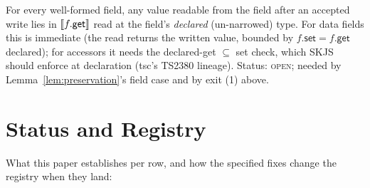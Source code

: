 \documentclass[11pt]{article}
\begin{document}
\begin{obligation}
\label{obl:getset}
For every well-formed field, any value readable from the field after an
accepted write lies in $\llbracket f.\mathsf{get} \rrbracket$ read at the field's
\emph{declared} (un-narrowed) type. For data fields this is immediate
(the read returns the written value, bounded by
$f.\mathsf{set} = f.\mathsf{get}$ declared); for accessors it needs the
declared-get $\subseteq$ set check, which SKJS should enforce at
declaration (tsc's TS2380 lineage). Status: \textsc{open}; needed by
Lemma~\ref{lem:preservation}'s field case and by exit (1) above.
\end{obligation}

\section{Status and Registry}
\label{sec:status}

What this paper establishes per row, and how the specified
fixes change the registry when they land:
\end{document}
